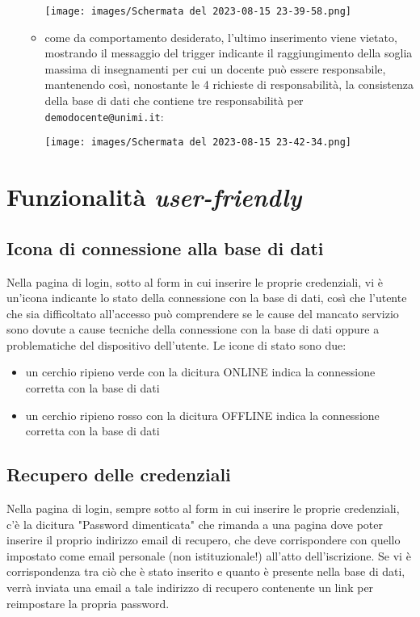 \documentclass{article}
\newcommand{\und}[0]{\textunderscore}
\begin{document}
\begin{itemize}
\begin{itemize}
        \texttt{[image: images/Schermata del 2023-08-15 23-39-58.png]}

        \item come da comportamento desiderato, l'ultimo inserimento viene vietato, mostrando il messaggio del trigger indicante il raggiungimento della soglia massima di insegnamenti per cui un docente può essere responsabile, mantenendo così, nonostante le 4 richieste di responsabilità, la consistenza della base di dati che contiene tre responsabilità per \texttt{demo\und docente@unimi.it}:

        \texttt{[image: images/Schermata del 2023-08-15 23-42-34.png]}
    \end{itemize}

    \pagebreak

\end{itemize}
\section{Funzionalità \textit{user-friendly}}
\subsection{Icona di connessione alla base di dati}
Nella pagina di login, sotto al form in cui inserire le proprie credenziali, vi è un'icona indicante lo stato della connessione con la base di dati, così che l'utente che sia difficoltato all'accesso può comprendere se le cause del mancato servizio sono dovute a cause tecniche della connessione con la base di dati oppure a problematiche del dispositivo dell'utente. Le icone di stato sono due:
\begin{itemize}
    \item un cerchio ripieno verde con la dicitura ONLINE indica la connessione corretta con la base di dati
    \item un cerchio ripieno rosso con la dicitura OFFLINE indica la connessione corretta con la base di dati
\end{itemize}
\subsection{Recupero delle credenziali}
Nella pagina di login, sempre sotto al form in cui inserire le proprie credenziali, c'è la dicitura "Password dimenticata" che rimanda a una pagina dove poter inserire il proprio indirizzo email di recupero, che deve corrispondere con quello impostato come email personale (non istituzionale!) all'atto dell'iscrizione. Se vi è corrispondenza tra ciò che è stato inserito e quanto è presente nella base di dati, verrà inviata una email a tale indirizzo di recupero contenente un link per reimpostare la propria password.
\end{document}
